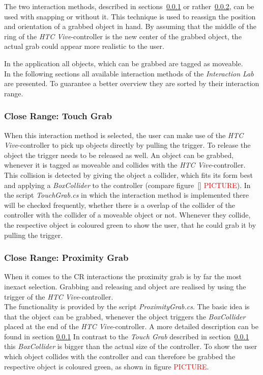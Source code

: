 The two interaction methods, described in sections~\ref{sec:TouchGrab} or rather~\ref{sec:ProximityGrab}, can be used with snapping or without it. This technique is used to reassign the position and orientation of a grabbed object in hand. By assuming that the middle of the ring of the \textit{HTC Vive}-controller is the new center of the grabbed object, the actual grab could appear more realistic to the user. 

In the application all objects, which can be grabbed are tagged as moveable.\\

In the following sections all available interaction methods of the \textit{Interaction Lab} are presented. To guarantee a better overview they are sorted by their interaction range. 

\subsubsection{Close Range: Touch Grab} \label{sec:TouchGrab}
When this interaction method is selected, the user can make use of the \textit{HTC Vive}-controller to pick up objects directly by pulling the trigger. To release the object the trigger needs to be released as well. An object can be grabbed, whenever it is tagged as moveable and collides with the \textit{HTC Vive}-controller. This collision is detected by giving the object a collider, which fits its form best \cite{website:BoxCollider}\cite{website:SphereCollider} and applying a \textit{BoxCollider} to the controller (compare figure~\ref{} \textcolor{red}{PICTURE}). In the script \textit{TouchGrab.cs} in which the interaction method is implemented there will be checked frequently, whether there is a overlap of the collider of the controller with the collider of a moveable object or not. Whenever they collide, the respective object is coloured green to show the user, that he could grab it by pulling the trigger. 

\subsubsection{Close Range: Proximity Grab} \label{sec:ProximityGrab}
When it comes to the CR interactions the proximity grab is by far the most inexact selection. Grabbing and releasing and object are realised by using the trigger of the \textit{HTC Vive}-controller.  \\
The functionality is provided by the script \textit{ProximityGrab.cs}. The basic idea is that the object can be grabbed, whenever the object triggers the \textit{BoxCollider} \cite{website:BoxCollider} placed at the end of the \textit{HTC Vive}-controller. A more detailed description can be found in section \ref{sec:TouchGrab} In contrast to the \textit{Touch Grab} described in section~\ref{sec:TouchGrab} this \textit{BoxCollider} is bigger than the actual size of the controller. To show the user which object collides with the controller and can therefore be grabbed the respective object is coloured green, as shown in figure \textcolor{red}{PICTURE}. 


